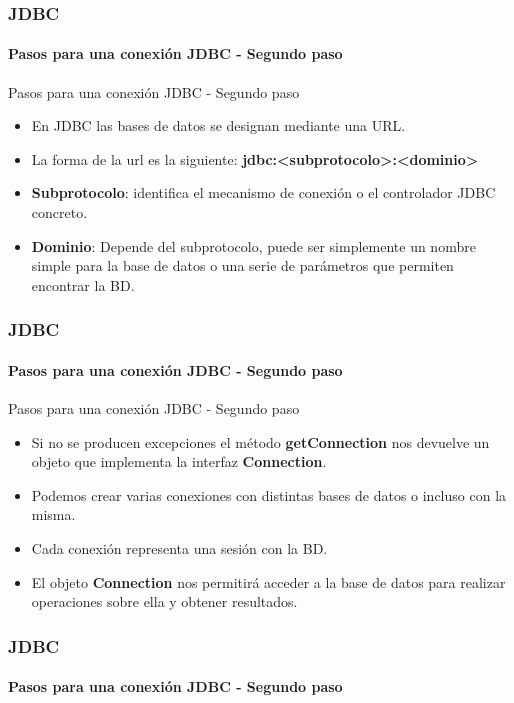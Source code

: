 \documentclass{beamer}
\begin{document}
	\begin{frame}
		\frametitle{JDBC}
		\framesubtitle{Pasos para una conexi\'on JDBC - Segundo paso}

        \begin{exampleblock}{Pasos para una conexi\'on JDBC - Segundo paso}
		    \begin{itemize}
		        \item En JDBC las bases de datos se designan mediante una URL.
		        \item La forma de la url es la siguiente: \textbf{jdbc:<subprotocolo>:<dominio>}
		        \item \textbf{Subprotocolo}: identifica el mecanismo de conexi\'on o el controlador JDBC concreto.
		        \item \textbf{Dominio}: Depende del subprotocolo, puede ser simplemente un nombre simple para la base de datos o una serie de par\'ametros que permiten encontrar la BD.
		    \end{itemize}
		    \end{exampleblock}
	\end{frame}

	\begin{frame}
		\frametitle{JDBC}
		\framesubtitle{Pasos para una conexi\'on JDBC - Segundo paso}

        \begin{exampleblock}{Pasos para una conexi\'on JDBC - Segundo paso}
		    \begin{itemize}
		        \item Si no se producen excepciones el m\'etodo \textbf{getConnection} nos devuelve un objeto que implementa la interfaz \textbf{Connection}.
		        \item Podemos crear varias conexiones con distintas bases de datos o incluso con la misma.
		        \item Cada conexi\'on representa una sesi\'on con la BD.
		        \item El objeto \textbf{Connection} nos permitir\'a acceder a la base de datos para realizar operaciones sobre ella y obtener resultados.
		    \end{itemize}
		    \end{exampleblock}
	\end{frame}

	\begin{frame}
		\frametitle{JDBC}
		\framesubtitle{Pasos para una conexi\'on JDBC - Segundo paso}

        
	\end{frame}
\end{document}
